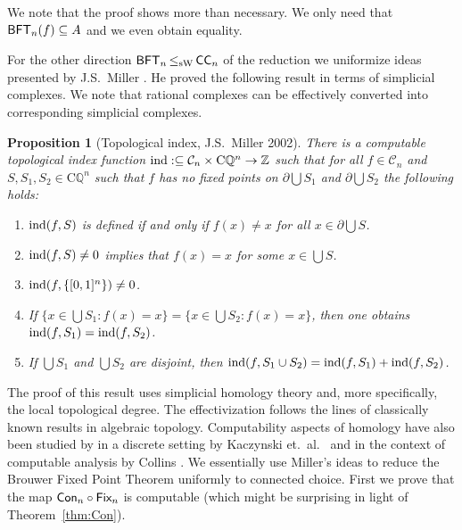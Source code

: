\documentclass[a4paper]{amsart}
\def\CC{{\mathcal C}}
\def\IQ{{\mathbb{Q}}}
\def\IZ{{\mathbb{Z}}}
\def\In{\subseteq}
\def\ind{{\rm ind}}
\def\BFT{\mbox{\rm\sffamily BFT}}
\def\ConC{\mbox{\rm\sffamily CC}}
\def\Con{\text{\rm\sffamily Con}}
\def\Fix{\text{\rm\sffamily Fix}}
\def\CQ{\mathrm C\IQ}
\def\leqSW{\mathop{\leq_{\mathrm{sW}}}}
\newtheorem{proposition}[theorem]{Proposition}
\theoremstyle{definition}
\begin{document}
We note that the proof shows more than necessary. We only need that $\BFT_n(f)\In A$ and we even obtain equality.

For the other direction $\BFT_n\leqSW\ConC_n$ of the reduction we uniformize ideas presented by J.S.\ Miller \cite[Section~2.3]{Mil02a}.
He proved the following result in terms of simplicial complexes. 
We note that rational complexes can be effectively converted into corresponding simplicial complexes.

\begin{proposition}[Topological index, J.S.\ Miller 2002]
\label{prop:index}
There is a computable topological index function $\ind:\In\CC_n\times\CQ^n\to\IZ$ such that for all $f\in\CC_n$ and $S,S_1,S_2\in\CQ^n$
such that $f$ has no fixed points on $\partial\bigcup S_1$ and $\partial\bigcup S_2$ the following holds:
\begin{enumerate}
\item $\ind(f,S)$ is defined if and only if $f(x)\not=x$ for all $x\in\partial\bigcup S$.
\item $\ind(f,S)\not=0$ implies that $f(x)=x$ for some $x\in\bigcup S$.
\item $\ind(f,\{[0,1]^n\})\not=0$.
\item If $\{x\in \bigcup S_1:f(x)=x\}=\{x\in \bigcup S_2:f(x)=x\}$, then one obtains $\ind(f,S_1)=\ind(f,S_2)$.
\item If $\bigcup S_1$ and $\bigcup S_2$ are disjoint, then $\ind(f,S_1\cup S_2)=\ind(f,S_1)+\ind(f,S_2)$.
\end{enumerate}
\end{proposition}

The proof of this result uses simplicial homology theory and, more specifically, the local topological degree.
The effectivization follows the lines of classically known results in algebraic topology.
Computability aspects of homology have also been studied by
in a discrete setting by Kaczynski et.\ al.\ \cite{KMM04} and in the context of computable analysis by Collins \cite{Col08,Col09}. 
We essentially use Miller's ideas to reduce the Brouwer Fixed Point Theorem uniformly to connected choice.
First we prove that the map $\Con_n\circ\Fix_n$ is computable (which might be surprising in light of Theorem~\ref{thm:Con}).
\end{document}
